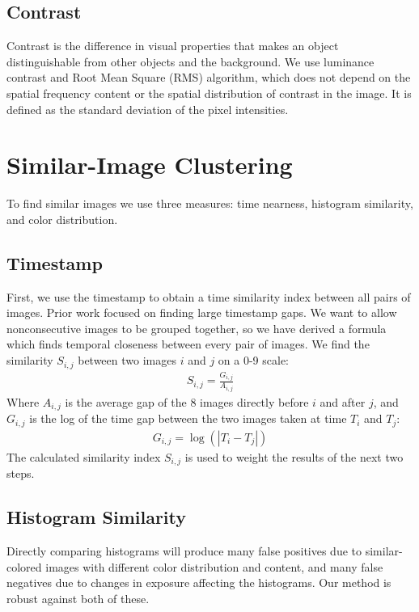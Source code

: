 \documentclass{sig-alternate}
\begin{document}
\subsection{Contrast}

Contrast is the difference in visual properties that makes an object distinguishable from other objects and the background.
We use luminance contrast and
Root Mean Square (RMS) algorithm, which does not depend on the spatial frequency content or the spatial distribution of contrast in the image. It is defined as the standard deviation of the pixel intensities\cite{ppr:1982}.

\section{Similar-Image Clustering}
To find similar images we use three measures: time nearness, histogram similarity, and color distribution.

\subsection{Timestamp}
First, we use the timestamp to obtain a time similarity index between all pairs of images. Prior work focused on finding large timestamp gaps\cite{1292402}. We want to allow nonconsecutive images to be grouped together, so we have derived a formula which finds temporal closeness between every pair of images. We find the similarity \(S_{i,j}\) between two images \(i\) and \(j\) on a 0-9 scale:
\begin{eqnarray}
S_{i,j}=\frac{G_{i,j}}{A_{i,j}}
\end{eqnarray}
Where \(A_{i,j}\) is the average gap of the 8 images directly before \(i\) and after \(j\), and  \(G_{i,j}\) is the log of the time gap between the two images taken at time \(T_i\) and \(T_j\):
\begin{eqnarray}
G_{i,j}=\log(|T_i-T_j|)
\end{eqnarray}
The calculated similarity index \(S_{i,j}\) is used to weight the results of the next two steps.


\subsection{Histogram Similarity}
Directly comparing histograms will produce many false positives due to similar-colored images with different color distribution and content, and many false negatives due to changes in exposure affecting the histograms. Our method is robust against both of these.
\end{document}
